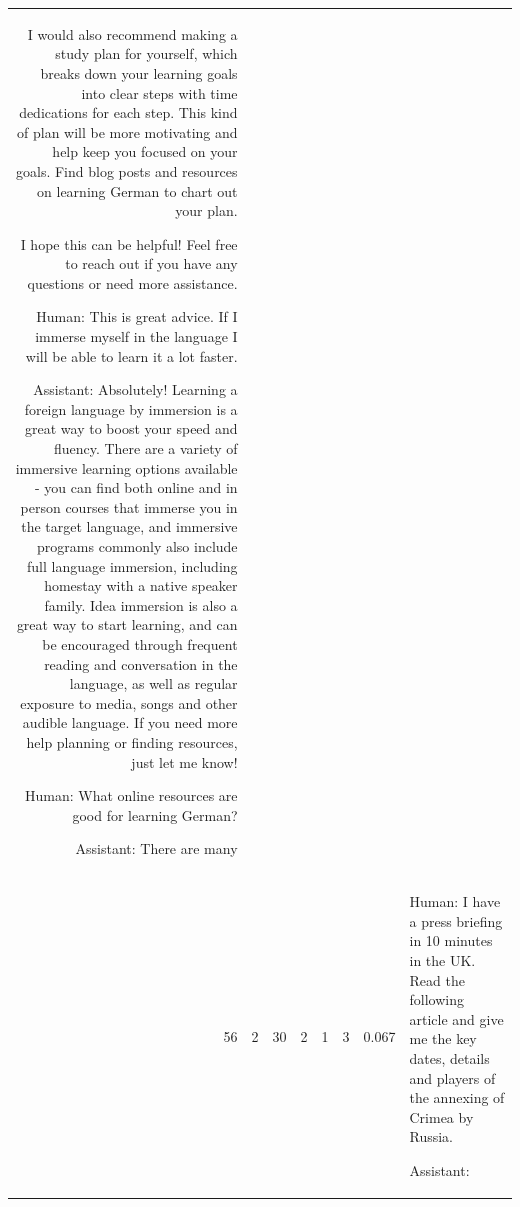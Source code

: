 \begin{tabular}{rrrrrrrl}
I would also recommend making a study plan for yourself, which breaks down your learning goals into clear steps with time dedications for each step.  This kind of plan will be more motivating and help keep you focused on your goals.  Find blog posts and resources on learning German to chart out your plan.  

I hope this can be helpful!  Feel free to reach out if you have any questions or need more assistance.

Human: This is great advice. If I immerse myself in the language I will be able to learn it a lot faster.

Assistant: Absolutely!  Learning a foreign language by immersion is a great way to boost your speed and fluency.  There are a variety of immersive learning options available - you can find both online and in person courses that immerse you in the target language, and immersive programs commonly also include full language immersion, including homestay with a native speaker family.  Idea immersion is also a great way to start learning, and can be encouraged through frequent reading and conversation in the language, as well as regular exposure to media, songs and other audible language.  If you need more help planning or finding resources, just let me know!

Human: What online resources are good for learning German?

Assistant: There are many  \\
56 & 2 & 30 & 2 & 1 & 3 & 0.067 & 

Human: I have a press briefing in 10 minutes in the UK. Read the following article and give me the key dates, details and players of the annexing of Crimea by Russia.

Assistant:  \\
\bottomrule
\end{tabular}
